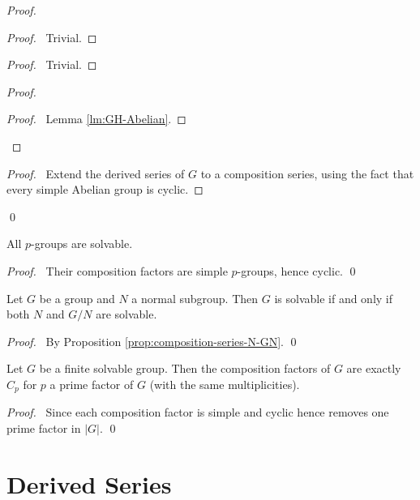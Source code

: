 \begin{proof}
\pf
{}
\begin{proof}
	\pf\ Trivial.
\end{proof}
\begin{proof}
	\pf\ Trivial.
\end{proof}
\begin{proof}
	\begin{proof}
		\pf\ Lemma \ref{lm:GH-Abelian}.
	\end{proof}
\end{proof}
\begin{proof}
	\pf\ Extend the derived series of $G$ to a composition series, using the fact that every simple Abelian group is cyclic.
\end{proof}
\qed
\end{proof}

\begin{cor}
All $p$-groups are solvable.
\end{cor}

\begin{proof}
\pf\ Their composition factors are simple $p$-groups, hence cyclic. \qed
\end{proof}

\begin{cor}
Let $G$ be a group and $N$ a normal subgroup. Then $G$ is solvable if and only if both $N$ and $G/N$ are solvable.
\end{cor}

\begin{proof}
\pf\ By Proposition \ref{prop:composition-series-N-GN}. \qed
\end{proof}

\begin{cor}
Let $G$ be a finite solvable group. Then the composition factors of $G$ are exactly $C_p$ for $p$ a prime factor of $G$ (with the same multiplicities).
\end{cor}

\begin{proof}
\pf\ Since each composition factor is simple and cyclic hence removes one prime factor in $|G|$. \qed
\end{proof}

\section{Derived Series}

